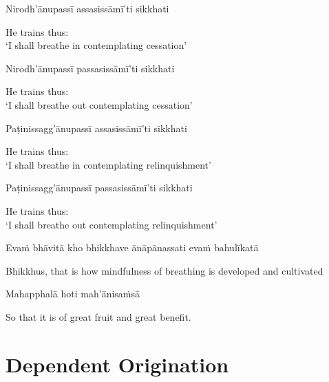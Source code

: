 Nirodh'ānupassī assasissāmī'ti sikkhati

\begin{english}
  He trains thus:\\
  `I shall breathe in contemplating cessation'
\end{english}

Nirodh'ānupassī passasissāmī'ti sikkhati

\begin{english}
  He trains thus:\\
  `I shall breathe out contemplating cessation'
\end{english}

Paṭinissagg'ānupassī assasissāmī'ti sikkhati

\begin{english}
  He trains thus:\\
  `I shall breathe in contemplating relinquishment'
\end{english}

Paṭinissagg'ānupassī passasissāmī'ti sikkhati

\begin{english}
  He trains thus:\\
  `I shall breathe out contemplating relinquishment'
\end{english}

Evaṁ bhāvitā kho bhikkhave ānāpānassati evaṁ bahulīkatā

\begin{english-hang}
  Bhikkhus, that is how mindfulness of breathing is developed and cultivated
\end{english-hang}

Mahapphalā hoti mah'ānisaṁsā

\begin{english}
  So that it is of great fruit and great benefit.
\end{english}

\suttaRef{[MN 118]}


\section{Dependent Origination}
\label{dependent-origination}

